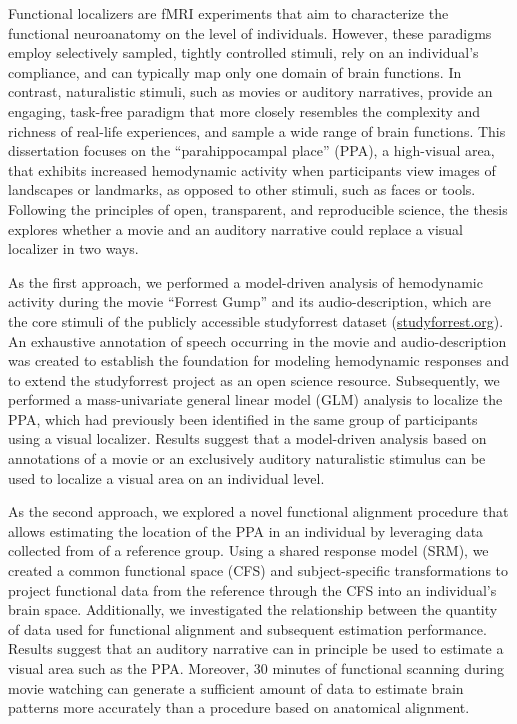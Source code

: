 Functional localizers are fMRI experiments that aim to characterize the
functional neuroanatomy on the level of individuals.
%
However, these paradigms employ selectively sampled, tightly controlled
stimuli, rely on an individual's compliance, and can typically map only one
domain of brain functions.
In contrast, naturalistic stimuli, such as movies or auditory narratives,
provide an engaging, task-free paradigm that more closely resembles the
complexity and richness of real-life experiences, and sample a wide range of
brain functions.
This dissertation focuses on the ``parahippocampal place'' (PPA), a high-visual
area, that exhibits increased hemodynamic activity when participants view
images of landscapes or landmarks, as opposed to other stimuli, such as faces
or tools.
Following the principles of open, transparent, and reproducible science, the
thesis explores whether a movie and an auditory narrative could replace a
visual localizer in two ways.

As the first approach, we performed a model-driven analysis of hemodynamic
activity during the movie ``Forrest Gump'' and its audio-description, which are
the core stimuli of the publicly accessible studyforrest dataset
(\href{www.studyforrest.org}{\url{studyforrest.org}}).
%
An exhaustive annotation of speech occurring in the movie and audio-description
was created to establish the foundation for modeling hemodynamic responses and
to extend the studyforrest project as an open science resource.
Subsequently, we performed a mass-univariate general linear model (GLM)
analysis to localize the PPA, which had previously been identified in the same
group of participants using a visual localizer.
Results suggest that a model-driven analysis based on annotations of a movie or
an exclusively auditory naturalistic stimulus can be used to localize a visual
area on an individual level.

As the second approach, we explored a novel functional alignment procedure that
allows estimating the location of the PPA in an individual by leveraging data
collected from of a reference group.
%
Using a shared response model (SRM), we created a common functional space (CFS)
and subject-specific transformations to project functional data from the
reference through the CFS into an individual's brain space.
%
Additionally, we investigated the relationship between the quantity of data
used for functional alignment and subsequent estimation performance.
%
Results suggest that an auditory narrative can in principle be used to estimate
a visual area such as the PPA.
%
Moreover, 30 minutes of functional scanning during movie watching can generate
a sufficient amount of data to estimate brain patterns more accurately than a
procedure based on anatomical alignment.

